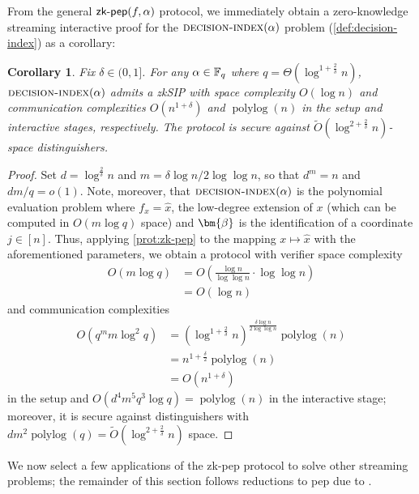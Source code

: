 \documentclass[a4paper,UKenglish,cleveref, autoref, thm-restate]{lipics-v2021}
\newtheorem{corollary}[theorem]{Corollary}
\theoremstyle{definition}
\newcommand{\zksip}{\textrm{zkSIP}}
\newcommand{\field}{\mathbb{F}}
\newcommand{\polylog}{\operatorname{polylog}}
\newcommand{\decisionindex}{\normalfont\textsc{decision-index}\xspace}
\newcommand{\pepprotocol}{\textsf{pep}\xspace}
\newcommand{\dimension}{m}
\newcommand{\degree}{d}
\newcommand{\fieldsize}{q}
\newcommand{\evaluationpoint}{\bm{\fe2}}
\def\fe#1{
    \ifnum#1=1
        \alpha
    \else
    \ifnum#1=2
        \beta
    \else
    \ifnum#1=3
        \gamma
    \fi\fi\fi
}
\begin{document}
From the general $\textsf{zk-pep}(f,\fe1)$ protocol, we immediately obtain a zero-knowledge streaming interactive proof for the $\decisionindex(\fe1)$ problem (\cref{def:decision-index}) as a corollary:
\begin{corollary}
    \label{cor:index}
    Fix $\delta \in (0,1]$. For any $\fe1 \in \field_\fieldsize$ where $\fieldsize = \Theta\left(\log^{1 + \frac{2}{\delta}} n\right)$, $\decisionindex(\fe1)$ admits a \zksip{} with space complexity $O(\log n)$ and communication complexities $O(n^{1 + \delta})$ and $\polylog(n)$ in the setup and interactive stages, respectively. The protocol is secure against $\tilde O\left(\log^{2 + \frac{2}{\delta}} n\right)$-space distinguishers.
\end{corollary}
\begin{proof}
    Set $\degree = \log^{\frac{2}{\delta}} n$ and $\dimension = \delta \log n / 2\log\log n$, so that $\degree^\dimension = n$ and $\degree\dimension/\fieldsize = o(1)$. Note, moreover, that $\decisionindex(\fe1)$ is the polynomial evaluation problem where $f_x = \hat x$, the low-degree extension of $x$ (which can be computed in $O(\dimension \log \fieldsize)$ space) and $\evaluationpoint$ is the identification of a coordinate $j \in [n]$. Thus, applying \cref{prot:zk-pep} to the mapping $x \mapsto \hat x$ with the aforementioned parameters, we obtain a protocol with verifier space complexity
    \begin{align*}
        O(\dimension \log \fieldsize) &= O\left(\frac{\log n}{\log \log n} \cdot \log \log n\right)\\
        &= O(\log n)
    \end{align*}
    and communication complexities
    \begin{align*}
        O(\fieldsize^\dimension \dimension \log^2 \fieldsize) &= \left(\log^{1 + \frac{2}{\delta}} n\right)^{\frac{\delta \log n}{2\log\log n}} \polylog(n)\\
        &= n^{1 + \frac{\delta}{2}} \polylog(n)\\
        &= O(n^{1 + \delta})
    \end{align*}
    in the setup and $O(\degree^4 \dimension^5 \fieldsize^3 \log \fieldsize) = \polylog(n)$ in the interactive stage; moreover, it is secure against distinguishers with $\degree\dimension^2 \polylog(\fieldsize) = \tilde O\left(\log^{2 + \frac{2}{\delta}} n\right)$ space.
\end{proof}

We now select a few applications of the \textsf{zk-pep} protocol to solve other streaming problems; the remainder of this section follows reductions to \pepprotocol due to \cite{CCMTV19}.
\end{document}
